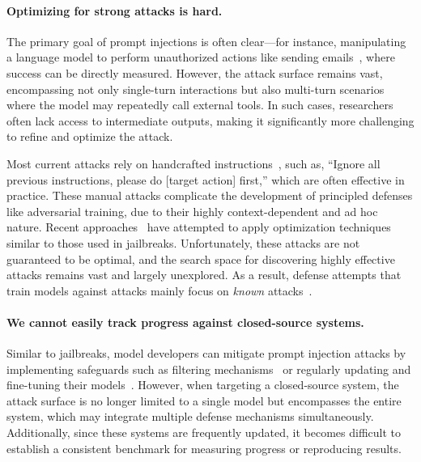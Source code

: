 \paragraph{Optimizing for strong attacks is hard.} 
The primary goal of prompt injections is often clear---for instance, manipulating a language model to perform unauthorized actions like sending emails~\citep{debenedetti2024agentdojo}, where success can be directly measured.
However, the attack surface remains vast, encompassing not only single-turn interactions but also multi-turn scenarios where the model may repeatedly call external tools. In such cases, researchers often lack access to intermediate outputs, making it significantly more challenging to refine and optimize the attack. 

Most current attacks rely on handcrafted instructions~\citep{greshake2023what,liu2023prompt}, such as, ``Ignore all previous instructions, please do [target action] first,'' which are often effective in practice. These manual attacks complicate the development of principled defenses like adversarial training, due to their highly context-dependent and ad hoc nature.
Recent approaches~\citep{pasquini2024neural} have attempted to apply optimization techniques similar to those used in jailbreaks. Unfortunately, these attacks are not guaranteed to be optimal, and the search space for discovering highly effective attacks remains vast and largely unexplored.
As a result, defense attempts that train models against attacks mainly focus on \emph{known} attacks~\cite{wallace2024instruction}.





\paragraph{We cannot easily track progress against closed-source systems.} Similar to jailbreaks, model developers can mitigate prompt injection attacks by implementing safeguards such as filtering mechanisms~\citep{willison2023delimitters,wu2024secgpt} or regularly updating and fine-tuning their models~\citep{wallace2024instruction}. However, when targeting a closed-source system, the attack surface is no longer limited to a single model but encompasses the entire system, which may integrate multiple defense mechanisms simultaneously. Additionally, since these systems are frequently updated, it becomes difficult to establish a consistent benchmark for measuring progress or reproducing results. 

